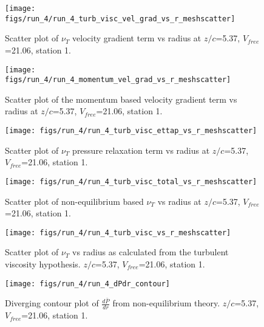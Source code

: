 \begin{figure}[H]
\centering
\texttt{[image: figs/run\_4/run\_4\_turb\_visc\_vel\_grad\_vs\_r\_meshscatter]}
\caption{Scatter plot of $\nu_T$ velocity gradient term vs radius at $z/c$=5.37, $V_{free}$=21.06, station 1.}
\end{figure}


\begin{figure}[H]
\centering
\texttt{[image: figs/run\_4/run\_4\_momentum\_vel\_grad\_vs\_r\_meshscatter]}
\caption{Scatter plot of the momentum based velocity gradient term vs radius at $z/c$=5.37, $V_{free}$=21.06, station 1.}
\end{figure}


\begin{figure}[H]
\centering
\texttt{[image: figs/run\_4/run\_4\_turb\_visc\_ettap\_vs\_r\_meshscatter]}
\caption{Scatter plot of $\nu_T$ pressure relaxation term vs radius at $z/c$=5.37, $V_{free}$=21.06, station 1.}
\end{figure}


\begin{figure}[H]
\centering
\texttt{[image: figs/run\_4/run\_4\_turb\_visc\_total\_vs\_r\_meshscatter]}
\caption{Scatter plot of non-equilibrium based $\nu_T$ vs radius at $z/c$=5.37, $V_{free}$=21.06, station 1.}
\end{figure}


\begin{figure}[H]
\centering
\texttt{[image: figs/run\_4/run\_4\_turb\_visc\_vs\_r\_meshscatter]}
\caption{Scatter plot of $\nu_T$ vs radius as calculated from the turbulent viscosity hypothesis. $z/c$=5.37, $V_{free}$=21.06, station 1.}
\end{figure}


\begin{figure}[H]
\centering
\texttt{[image: figs/run\_4/run\_4\_dPdr\_contour]}
\caption{Diverging contour plot of $\frac{d\bar{P}}{dr}$ from non-equilibrium theory. $z/c$=5.37, $V_{free}$=21.06, station 1.}
\end{figure}



